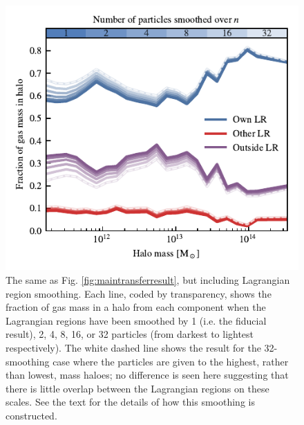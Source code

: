 \begin{figure}
	\centering
	\includegraphics{figures/convergence_smoothing.pdf}
	\vspace{-0.7cm}
 \caption{The same as Fig. \ref{fig:maintransferresult}, but including
 Lagrangian region smoothing. Each line, coded by transparency, shows the
 fraction of gas mass in a halo from each component when the Lagrangian
 regions have been smoothed by 1 (i.e. the fiducial result), 2, 4, 8, 16, or
 32 particles (from darkest to lightest respectively). The white dashed line
 shows the result for the 32-smoothing case where the particles are given to
 the highest, rather than lowest, mass haloes; no difference is seen here
 suggesting that there is little overlap between the Lagrangian regions on
 these scales. See the text for the details of how this smoothing is
 constructed.}
	\label{fig:smoothconv}
\end{figure}

